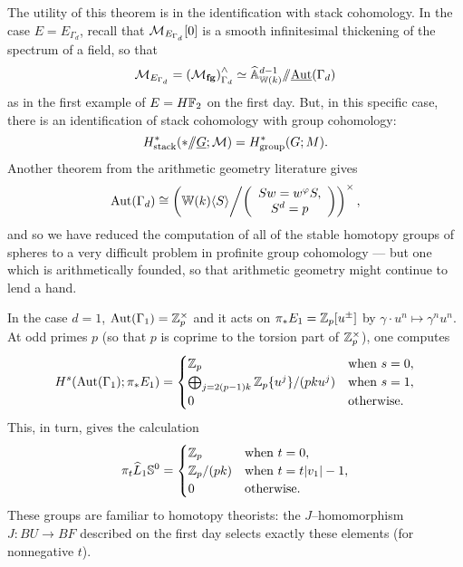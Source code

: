 The utility of this theorem is in the identification with stack cohomology.  In the case $E = E_{\Gamma_d}$, recall that $\context{E_{\Gamma_d}}[0]$ is a smooth infinitesimal thickening of the spectrum of a field, so that \[\context{E_{\Gamma_d}} = \left( \moduli{fg} \right)^\wedge_{\Gamma_d} \simeq \widehat{\mathbb A}^{d-1}_{\mathbb W(k)} \mmod \underline{\operatorname{Aut}}(\Gamma_d)\] as in the first example of $E = H\F_2$ on the first day.  But, in this specific case, there is an identification of stack cohomology with group cohomology: \[H^*_{\mathrm{stack}}(* \mmod \underline{G}; \mathcal M) = H^*_{\mathrm{group}}(G; M).\]  Another theorem from the arithmetic geometry literature gives \[\operatorname{Aut}(\Gamma_d) \cong \left( \mathbb{W}(k)\langle S \rangle \middle/ \left( \begin{array}{c} Sw = w^\phi S, \\ S^d = p \end{array} \right) \right)^\times,\] and so we have reduced the computation of all of the stable homotopy groups of spheres to a very difficult problem in profinite group cohomology --- but one which is arithmetically founded, so that arithmetic geometry might continue to lend a hand.

\begin{example}[Adams]
In the case $d = 1$, $\operatorname{Aut}(\Gamma_1) = \Z_p^\times$ and it acts on $\pi_* E_1 = \Z_p[u^\pm]$ by $\gamma \cdot u^n \mapsto \gamma^n u^n$.  At odd primes $p$ (so that $p$ is coprime to the torsion part of $\Z_p^\times$), one computes \[H^s(\operatorname{Aut}(\Gamma_1); \pi_* E_1) = \begin{cases}\Z_p & \text{when $s = 0$}, \\ \bigoplus_{j = 2(p-1)k} \Z_p\{u^j\} / (pk u^j) & \text{when $s = 1$}, \\ 0 & \text{otherwise}. \end{cases}\]  This, in turn, gives the calculation \[\pi_t \widehat L_1 \S^0 = \begin{cases} \Z_p & \text{when $t = 0$}, \\ \Z_p / (pk) & \text{when $t = t|v_1| - 1$}, \\ 0 & \text{otherwise}. \end{cases}\]  These groups are familiar to homotopy theorists: the $J$--homomorphism $J: BU \to BF$ described on the first day selects exactly these elements (for nonnegative $t$).
\end{example}
